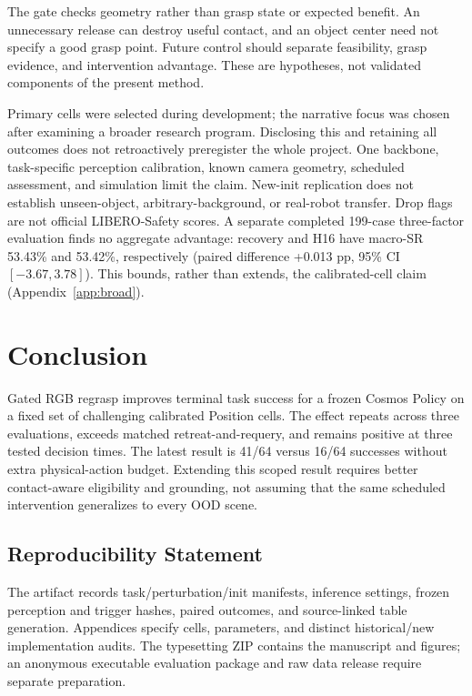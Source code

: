 \documentclass{article}
\begin{document}
The gate checks geometry rather than grasp state or expected benefit.
An unnecessary release can destroy useful contact, and an object center
need not specify a good grasp point.
Future control should separate feasibility, grasp evidence, and intervention
advantage. These are hypotheses, not validated components of the present method.

Primary cells were selected during development; the narrative focus was
chosen after examining a broader research program. Disclosing this and
retaining all outcomes does not retroactively preregister the whole project.
One backbone, task-specific perception calibration, known camera geometry,
scheduled assessment, and simulation limit the claim.
New-init replication does not establish unseen-object, arbitrary-background,
or real-robot transfer. Drop flags are not official LIBERO-Safety scores.
A separate completed 199-case three-factor evaluation finds no aggregate
advantage: recovery and H16 have macro-SR 53.43\% and 53.42\%, respectively
(paired difference +0.013 pp, 95\% CI $[-3.67,3.78]$).
This bounds, rather than extends, the calibrated-cell claim
(Appendix~\ref{app:broad}).

\section{Conclusion}
Gated RGB regrasp improves terminal task success for a frozen Cosmos Policy
on a fixed set of challenging calibrated Position cells. The effect repeats
across three evaluations, exceeds matched retreat-and-requery, and remains
positive at three tested decision times.
The latest result is 41/64 versus 16/64 successes without extra physical-action
budget. Extending this scoped result requires better contact-aware eligibility
and grounding, not assuming that the same scheduled intervention generalizes
to every OOD scene.
\label{sec:main_end}

\subsection*{Reproducibility Statement}
The artifact records task/perturbation/init manifests, inference settings,
frozen perception and trigger hashes, paired outcomes, and source-linked
table generation. Appendices specify cells, parameters, and distinct
historical/new implementation audits.
The typesetting ZIP contains the manuscript and figures; an anonymous
executable evaluation package and raw data release require separate preparation.
\end{document}
